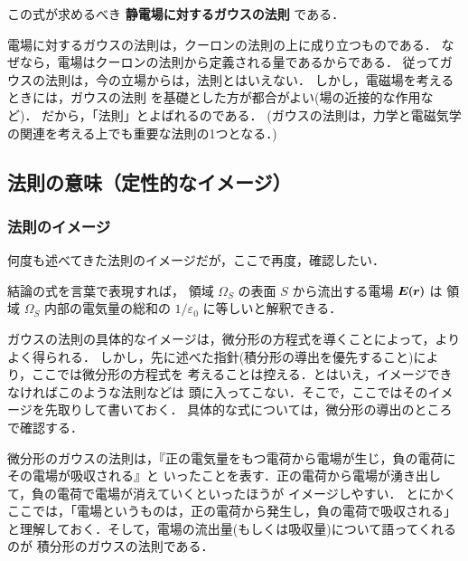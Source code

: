             この式が求めるべき \textbf{静電場に対するガウスの法則} である．

            電場に対するガウスの法則は，クーロンの法則の上に成り立つものである．
            なぜなら，電場はクーロンの法則から定義される量であるからである．
            従ってガウスの法則は，今の立場からは，法則とはいえない．
            しかし，電磁場を考えるときには，ガウスの法則
            を基礎とした方が都合がよい(場の近接的な作用など)．
            だから，「法則」とよばれるのである．
            (ガウスの法則は，力学と電磁気学の関連を考える上でも重要な法則の1つとなる．)


    \subsection{法則の意味（定性的なイメージ）}
        \subsubsection{法則のイメージ}
            何度も述べてきた法則のイメージだが，ここで再度，確認したい．

            結論の式を言葉で表現すれば，
            領域 $\Omega_{S}$ の表面 $S$ から流出する電場 $\boldsymbol{E}(\boldsymbol{r})$ は
            領域 $\Omega_{S}$ 内部の電気量の総和の $1/\varepsilon_{0}$ に等しいと解釈できる．

            ガウスの法則の具体的なイメージは，微分形の方程式を導くことによって，よりよく得られる．
            しかし，先に述べた指針(積分形の導出を優先すること)により，ここでは微分形の方程式を
            考えることは控える．とはいえ，イメージできなければこのような法則などは
            頭に入ってこない．そこで，ここではそのイメージを先取りして書いておく．
            具体的な式については，微分形の導出のところで確認する．

            微分形のガウスの法則は，『正の電気量をもつ電荷から電場が生じ，負の電荷にその電場が吸収される』と
            いったことを表す．正の電荷から電場が湧き出して，負の電荷で電場が消えていくといったほうが
            イメージしやすい．
            とにかくここでは，「電場というものは，正の電荷から発生し，負の電荷で吸収される」
            と理解しておく．そして，電場の流出量(もしくは吸収量)について語ってくれるのが
            積分形のガウスの法則である．


